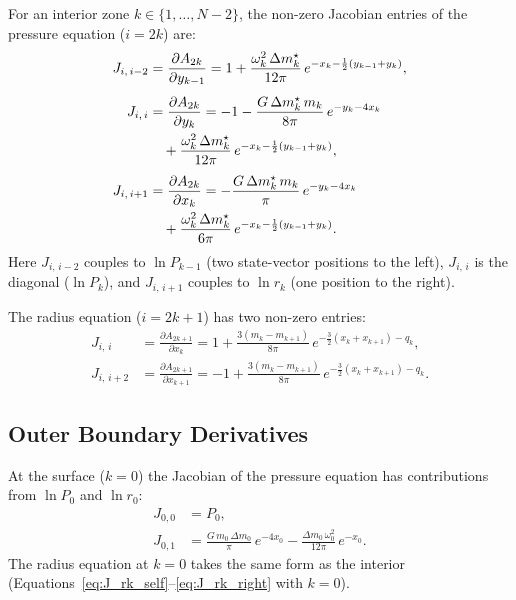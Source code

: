 \documentclass{aastex631}
\newcommand{\pp}{\partial}
\begin{document}
For an interior zone $k\in\{1,\ldots,N-2\}$, the non-zero Jacobian
entries of the pressure equation ($i = 2k$) are:
\begin{align}
  J_{i,\,i-2}
  &= \frac{\pp A_{2k}}{\pp y_{k-1}}
   = 1 + \frac{\omega_k^2\,\Delta m_k^{\star}}{12\pi}\,
     e^{-x_k - \frac{1}{2}(y_{k-1}+y_k)},
  \label{eq:J_pk_left}
\\[4pt]
  J_{i,\,i}
  &= \frac{\pp A_{2k}}{\pp y_k}
   = -1 - \frac{G\,\Delta m_k^{\star}\,m_k}{8\pi}\,
     e^{-y_k - 4x_k}
  \notag\\
  &\quad + \frac{\omega_k^2\,\Delta m_k^{\star}}{12\pi}\,
     e^{-x_k - \frac{1}{2}(y_{k-1}+y_k)},
  \label{eq:J_pk_self}
\\[4pt]
  J_{i,\,i+1}
  &= \frac{\pp A_{2k}}{\pp x_k}
   = -\frac{G\,\Delta m_k^{\star}\,m_k}{\pi}\,
     e^{-y_k - 4x_k}
  \notag\\
  &\quad + \frac{\omega_k^2\,\Delta m_k^{\star}}{6\pi}\,
     e^{-x_k - \frac{1}{2}(y_{k-1}+y_k)}.
  \label{eq:J_pk_right}
\end{align}
Here $J_{i,\,i-2}$ couples to $\ln P_{k-1}$ (two state-vector
positions to the left), $J_{i,\,i}$ is the diagonal ($\ln P_k$), and
$J_{i,\,i+1}$ couples to $\ln r_k$ (one position to the right).

The radius equation ($i = 2k+1$) has two non-zero entries:
\begin{align}
  J_{i,\,i}
  &= \frac{\pp A_{2k+1}}{\pp x_k}
   = 1 + \frac{3(m_k - m_{k+1})}{8\pi}\,
     e^{-\frac{3}{2}(x_k+x_{k+1}) - q_k},
  \label{eq:J_rk_self}
\\[4pt]
  J_{i,\,i+2}
  &= \frac{\pp A_{2k+1}}{\pp x_{k+1}}
   = -1 + \frac{3(m_k - m_{k+1})}{8\pi}\,
     e^{-\frac{3}{2}(x_k+x_{k+1}) - q_k}.
  \label{eq:J_rk_right}
\end{align}

\subsection{Outer Boundary Derivatives}

At the surface ($k=0$) the Jacobian of the pressure equation has
contributions from $\ln P_0$ and $\ln r_0$:
\begin{align}
  J_{0,0} &= P_0, \label{eq:J_surf_P} \\
  J_{0,1} &= \frac{G\,m_0\,\Delta m_0}{\pi}\,e^{-4x_0}
             - \frac{\Delta m_0\,\omega_0^2}{12\pi}\,e^{-x_0}.
  \label{eq:J_surf_r}
\end{align}
The radius equation at $k=0$ takes the same form as the interior
(Equations~\ref{eq:J_rk_self}--\ref{eq:J_rk_right} with $k=0$).
\end{document}
